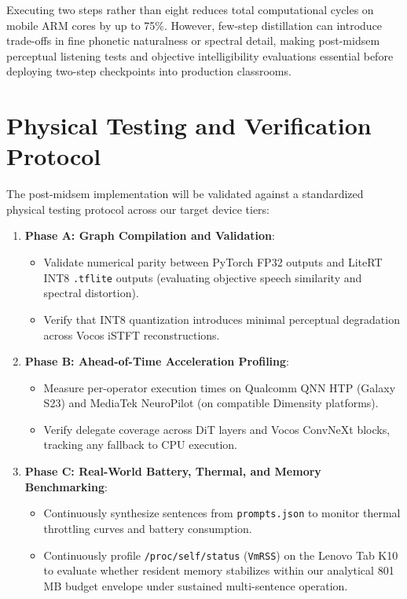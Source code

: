 Executing two steps rather than eight reduces total computational cycles on mobile ARM cores by up to 75\%. However, few-step distillation can introduce trade-offs in fine phonetic naturalness or spectral detail, making post-midsem perceptual listening tests and objective intelligibility evaluations essential before deploying two-step checkpoints into production classrooms.

\section{Physical Testing and Verification Protocol}
The post-midsem implementation will be validated against a standardized physical testing protocol across our target device tiers:

\begin{enumerate}
    \item \textbf{Phase A: Graph Compilation and Validation}:
    \begin{itemize}
        \item Validate numerical parity between PyTorch FP32 outputs and LiteRT INT8 \texttt{.tflite} outputs (evaluating objective speech similarity and spectral distortion).
        \item Verify that INT8 quantization introduces minimal perceptual degradation across Vocos iSTFT reconstructions.
    \end{itemize}
    
    \item \textbf{Phase B: Ahead-of-Time Acceleration Profiling}:
    \begin{itemize}
        \item Measure per-operator execution times on Qualcomm QNN HTP (Galaxy S23) and MediaTek NeuroPilot (on compatible Dimensity platforms).
        \item Verify delegate coverage across DiT layers and Vocos ConvNeXt blocks, tracking any fallback to CPU execution.
    \end{itemize}
    
    \item \textbf{Phase C: Real-World Battery, Thermal, and Memory Benchmarking}:
    \begin{itemize}
        \item Continuously synthesize sentences from \texttt{prompts.json} to monitor thermal throttling curves and battery consumption.
        \item Continuously profile \texttt{/proc/self/status} (\texttt{VmRSS}) on the Lenovo Tab K10 to evaluate whether resident memory stabilizes within our analytical 801\,MB budget envelope under sustained multi-sentence operation.
    \end{itemize}
\end{enumerate}
